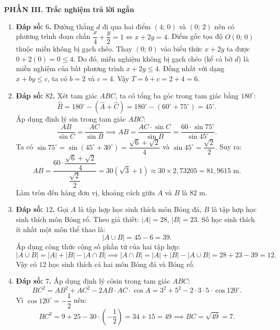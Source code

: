 \documentclass[12pt,a4paper]{article}
\begin{document}
\vspace{0.3cm}
\textbf{\large PHẦN III. Trắc nghiệm trả lời ngắn}
\begin{enumerate}[label=\textbf{Câu \arabic*.},leftmargin=1.1cm]
\item \textbf{Đáp số: $6$.}
Đường thẳng $d$ đi qua hai điểm $(4;\, 0)$ và $(0;\, 2)$ nên có phương trình đoạn chắn $\dfrac{x}{4} + \dfrac{y}{2} = 1 \iff x + 2y = 4$.
Điểm gốc tọa độ $O(0;\, 0)$ thuộc miền không bị gạch chéo. Thay $(0;\, 0)$ vào biểu thức $x + 2y$ ta được $0 + 2(0) = 0 \le 4$.
Do đó, miền nghiệm không bị gạch chéo (kể cả bờ $d$) là miền nghiệm của bất phương trình $x + 2y \le 4$.
Đồng nhất với dạng $x + by \le c$, ta có $b = 2$ và $c = 4$.
Vậy $T = b + c = 2 + 4 = 6$.

\item \textbf{Đáp số: $82$.}
Xét tam giác $ABC$, ta có tổng ba góc trong tam giác bằng $180^\circ$:
\[
\widehat{B} = 180^\circ - (\widehat{A} + \widehat{C}) = 180^\circ - (60^\circ + 75^\circ) = 45^\circ.
\]
Áp dụng định lý sin trong tam giác $ABC$:
\[
\dfrac{AB}{\sin C} = \dfrac{AC}{\sin B} \implies AB = \dfrac{AC \cdot \sin C}{\sin B} = \dfrac{60 \cdot \sin 75^\circ}{\sin 45^\circ}.
\]
Ta có $\sin 75^\circ = \sin(45^\circ + 30^\circ) = \dfrac{\sqrt{6} + \sqrt{2}}{4}$ và $\sin 45^\circ = \dfrac{\sqrt{2}}{2}$.
Suy ra:
\[
AB = \dfrac{60 \cdot \dfrac{\sqrt{6} + \sqrt{2}}{4}}{\dfrac{\sqrt{2}}{2}} = 30(\sqrt{3} + 1) \approx 30 \times 2{,}73205 = 81{,}9615\text{ m}.
\]
Làm tròn đến hàng đơn vị, khoảng cách giữa $A$ và $B$ là $82\text{ m}$.

\item \textbf{Đáp số: $12$.}
Gọi $A$ là tập hợp học sinh thích môn Bóng đá, $B$ là tập hợp học sinh thích môn Bóng rổ.
Theo giả thiết: $|A| = 28$, $|B| = 23$.
Số học sinh thích ít nhất một môn thể thao là:
\[
|A \cup B| = 45 - 6 = 39.
\]
Áp dụng công thức cộng số phần tử của hai tập hợp:
\[
|A \cup B| = |A| + |B| - |A \cap B| \implies |A \cap B| = |A| + |B| - |A \cup B| = 28 + 23 - 39 = 12.
\]
Vậy có $12$ học sinh thích cả hai môn Bóng đá và Bóng rổ.

\item \textbf{Đáp số: $7$.}
Áp dụng định lý côsin trong tam giác $ABC$:
\[
BC^2 = AB^2 + AC^2 - 2AB \cdot AC \cdot \cos A = 3^2 + 5^2 - 2 \cdot 3 \cdot 5 \cdot \cos 120^\circ.
\]
Vì $\cos 120^\circ = -\dfrac{1}{2}$ nên:
\[
BC^2 = 9 + 25 - 30 \cdot \left(-\dfrac{1}{2}\right) = 34 + 15 = 49 \implies BC = \sqrt{49} = 7.
\]
\end{enumerate}
\end{document}
